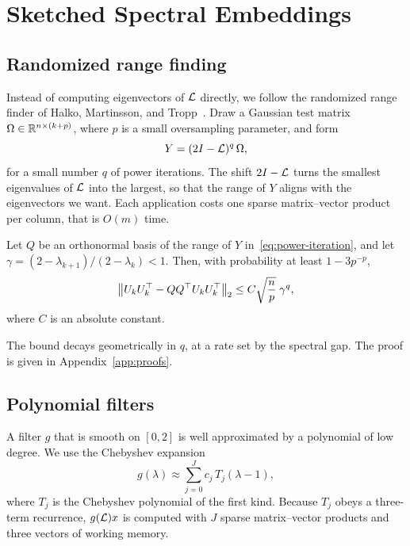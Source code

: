 \chapter{Sketched Spectral Embeddings}
\label{ch:methods}

\section{Randomized range finding}

Instead of computing eigenvectors of $\mathcal{L}$ directly, we follow the randomized range finder of Halko, Martinsson, and Tropp~\cite{halko2011finding}. Draw a Gaussian test matrix $\Omega \in \mathbb{R}^{n \times (k+p)}$, where $p$ is a small oversampling parameter, and form
\begin{equation}
  Y = (2I - \mathcal{L})^q \, \Omega ,
  \label{eq:power-iteration}
\end{equation}
for a small number $q$ of power iterations. The shift $2I - \mathcal{L}$ turns the smallest eigenvalues of $\mathcal{L}$ into the largest, so that the range of $Y$ aligns with the eigenvectors we want. Each application costs one sparse matrix--vector product per column, that is $O(m)$ time.

\begin{theorem}
\label{thm:sketch}
Let $Q$ be an orthonormal basis of the range of $Y$ in~\eqref{eq:power-iteration}, and let $\gamma = (2 - \lambda_{k+1}) / (2 - \lambda_k) < 1$. Then, with probability at least $1 - 3p^{-p}$,
\[
  \left\lVert U_k U_k^\top - Q Q^\top U_k U_k^\top \right\rVert_2 \le C \sqrt{\frac{n}{p}} \; \gamma^{q},
\]
where $C$ is an absolute constant.
\end{theorem}

The bound decays geometrically in $q$, at a rate set by the spectral gap. The proof is given in Appendix~\ref{app:proofs}.

\section{Polynomial filters}

A filter $g$ that is smooth on $[0, 2]$ is well approximated by a polynomial of low degree. We use the Chebyshev expansion
\begin{equation}
  g(\lambda) \approx \sum_{j=0}^{J} c_j \, T_j(\lambda - 1),
\end{equation}
where $T_j$ is the Chebyshev polynomial of the first kind. Because $T_j$ obeys a three-term recurrence, $g(\mathcal{L}) x$ is computed with $J$ sparse matrix--vector products and three vectors of working memory.

